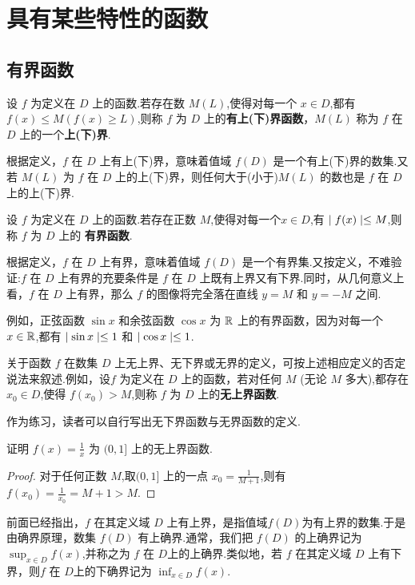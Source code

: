 \section{具有某些特性的函数}

\subsection{有界函数}

\begin{definition}[有界函数]
    设 $f$ 为定义在 $D$ 上的函数.若存在数 $M(L)$,使得对每一个 $x\in D$,都有 $f(x)\le M (f(x)\ge L)$,则称 $f$ 为 $D$ 上的\textbf{有上(下)界函数}，$M(L)$ 称为 $f$ 在 $D$ 上的一个\textbf{上(下)界}.
\end{definition}

根据定义，$f$ 在 $D$ 上有上(下)界，意味着值域 $f(D)$ 是一个有上(下)界的数集.又若 $M(L)$ 为 $f$ 在 $D$ 上的上(下)界，则任何大于(小于)$M(L)$ 的数也是 $f$ 在 $D$ 上的上(下)界.

\begin{definition}
    设 $f$ 为定义在 $D$ 上的函数.若存在正数 $M$,使得对每一个$x\in D$,有 $\mid f(x) \mid\le M$,则称 $f$ 为 $D$ 上的 \textbf{有界函数}.
\end{definition}

根据定义，$f$ 在 $D$ 上有界，意味着值域 $f(D)$ 是一个有界集.又按定义，不难验证:$f$ 在 $D$ 上有界的充要条件是 $f$ 在 $D$ 上既有上界又有下界.同时，从几何意义上看，$f$ 在 $D$ 上有界，那么 $f$ 的图像将完全落在直线 $y=M$ 和 $y=-M$ 之间.

例如，正弦函数 $\sin x$ 和余弦函数 $\cos x$ 为 $\mathbb{R}$ 上的有界函数，因为对每一个$x\in \mathbb{R}$,都有 $\mid \sin x \mid\le 1$ 和 $\mid \cos x \mid\le 1$.

关于函数 $f$ 在数集 $D$ 上无上界、无下界或无界的定义，可按上述相应定义的否定说法来叙述.例如，设$f$ 为定义在 $D$ 上的函数，若对任何 $M$ (无论 $M$ 多大),都存在 $x_0\in D$,使得 $f(x_0)>M$,则称 $f$ 为 $D$ 上的\textbf{无上界函数}.

作为练习，读者可以自行写出无下界函数与无界函数的定义.

\begin{example}
    证明 $f(x)=\frac{1}{x}$ 为 $(0,1]$ 上的无上界函数.
\end{example}

\begin{proof}
    对于任何正数 $M$,取$(0,1]$ 上的一点 $x_0=\frac{1}{M+1}$,则有 $f(x_0)=\frac{1}{x_0}=M+1>M$.
\end{proof}

前面已经指出，$f$ 在其定义域 $D$ 上有上界，是指值域$f(D)$为有上界的数集.于是由确界原理，数集 $f(D)$ 有上确界.通常，我们把 $f(D)$ 的上确界记为 $\sup_{x\in D} f(x)$,并称之为 $f$ 在 $D$上的上确界.类似地，若 $f$ 在其定义域 $D$ 上有下界，则$f$ 在 $D$上的下确界记为 $\inf_{x\in D} f(x)$.

